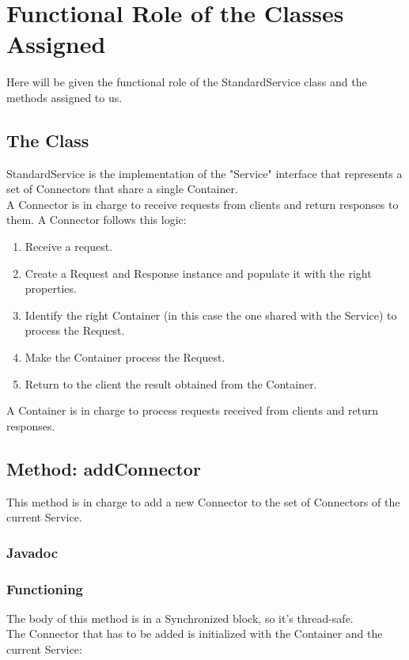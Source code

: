 \documentclass[../../codeInspection.tex]{subfiles}
\begin{document}
	\chapter{Functional Role of the Classes Assigned}

	Here will be given the functional role of the StandardService class and the methods assigned to us.

	\section{The Class}
		StandardService is the implementation of the "Service" interface that represents a set of Connectors that share a single Container.\\
		A Connector is in charge to receive requests from clients and return responses to them.
		A Connector follows this logic:
		\begin{enumerate}
				\item Receive a request.
				\item Create a Request and Response instance and populate it with the right properties.
				\item Identify the right Container (in this case the one shared with the Service) to process the Request.
				\item Make the Container process the Request.
				\item Return to the client the result obtained from the Container.
		\end{enumerate}

		A Container is in charge to process requests received from clients and return responses.

	\section{Method: addConnector}

		This method is in charge to add a new Connector to the set of Connectors of the current Service.

		\subsection{Javadoc}
			

		\subsection{Functioning}
			The body of this method is in a Synchronized block, so it's thread-safe.\\
			The Connector that has to be added is initialized with the Container and the current Service:
			
\end{document}
